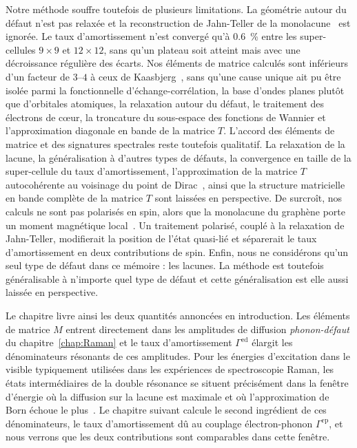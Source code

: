 Notre méthode souffre toutefois de plusieurs limitations. La géométrie autour du défaut n'est pas relaxée et la reconstruction de Jahn-Teller de la monolacune~\cite{el-barbaryStructureEnergeticsVacancy2003} est ignorée. Le taux d'amortissement n'est convergé qu'à $0.6$~\% entre les super-cellules $9\times 9$ et $12\times 12$, sans qu'un plateau soit atteint mais avec une décroissance régulière des écarts. Nos éléments de matrice calculés sont inférieurs d'un facteur de $3$--$4$ à ceux de Kaasbjerg~\cite{kaasbjergAtomisticMatrixTheory2020}, sans qu'une cause unique ait pu être isolée parmi la fonctionnelle d'échange-corrélation, la base d'ondes planes plutôt que d'orbitales atomiques, la relaxation autour du défaut, le traitement des électrons de c\oe ur, la troncature du sous-espace des fonctions de Wannier et l'approximation diagonale en bande de la matrice $T$. L'accord des éléments de matrice et des signatures spectrales reste toutefois qualitatif. La relaxation de la lacune, la généralisation à d'autres types de défauts, la convergence en taille de la super-cellule du taux d'amortissement, l'approximation de la matrice $T$ autocohérente au voisinage du point de Dirac~\cite{peresElectronicPropertiesDisordered2006}, ainsi que la structure matricielle en bande complète de la matrice $T$ sont laissées en perspective. De surcroît, nos calculs ne sont pas polarisés en spin, alors que la monolacune du graphène porte un moment magnétique local~\cite{yazyevDefectinducedMagnetismGraphene2007}. Un traitement polarisé, couplé à la relaxation de Jahn-Teller, modifierait la position de l'état quasi-lié et séparerait le taux d'amortissement en deux contributions de spin. Enfin, nous ne considérons qu'un seul type de défaut dans ce mémoire : les lacunes. La méthode est toutefois généralisable à n'importe quel type de défaut et cette généralisation est elle aussi laissée en perspective.

Le chapitre livre ainsi les deux quantités annoncées en introduction. Les éléments de matrice $M$ entrent directement dans les amplitudes de diffusion \textit{phonon-défaut} du chapitre~\ref{chap:Raman} et le taux d'amortissement $\Gamma^\text{ed}$ élargit les dénominateurs résonants de ces amplitudes. Pour les énergies d'excitation dans le visible typiquement utilisées dans les expériences de spectroscopie Raman, les états intermédiaires de la double résonance se situent précisément dans la fenêtre d'énergie où la diffusion sur la lacune est maximale et où l'approximation de Born échoue le plus~\cite{thomsenDoubleResonantRaman2000}. Le chapitre suivant calcule le second ingrédient de ces dénominateurs, le taux d'amortissement dû au couplage électron-phonon $\Gamma^\text{ep}$, et nous verrons que les deux contributions sont comparables dans cette fenêtre.